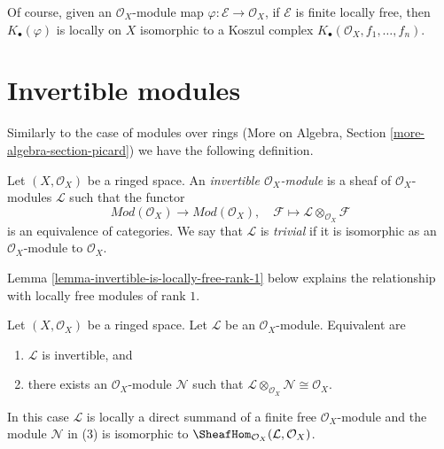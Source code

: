 \noindent
Of course, given an $\mathcal{O}_X$-module map
$\varphi : \mathcal{E} \to \mathcal{O}_X$,
if $\mathcal{E}$ is finite locally free, then
$K_\bullet(\varphi)$ is locally on $X$ isomorphic to a Koszul complex
$K_\bullet(\mathcal{O}_X, f_1, \ldots, f_n)$.



\section{Invertible modules}
\label{section-invertible}

\noindent
Similarly to the case of modules over rings
(More on Algebra, Section \ref{more-algebra-section-picard})
we have the following definition.

\begin{definition}
\label{definition-invertible}
Let $(X, \mathcal{O}_X)$ be a ringed space. An
{\it invertible $\mathcal{O}_X$-module} is a sheaf
of $\mathcal{O}_X$-modules $\mathcal{L}$ such that
the functor
$$
\textit{Mod}(\mathcal{O}_X) \longrightarrow \textit{Mod}(\mathcal{O}_X),\quad
\mathcal{F} \longmapsto \mathcal{L} \otimes_{\mathcal{O}_X} \mathcal{F}
$$
is an equivalence of categories. We say that $\mathcal{L}$ is
{\it trivial} if it is isomorphic as an $\mathcal{O}_X$-module
to $\mathcal{O}_X$.
\end{definition}

\noindent
Lemma \ref{lemma-invertible-is-locally-free-rank-1}
below explains the relationship with locally free modules
of rank $1$.

\begin{lemma}
\label{lemma-invertible}
Let $(X, \mathcal{O}_X)$ be a ringed space. Let $\mathcal{L}$
be an $\mathcal{O}_X$-module. Equivalent are
\begin{enumerate}
\item $\mathcal{L}$ is invertible, and
\item there exists an $\mathcal{O}_X$-module $\mathcal{N}$
such that
$\mathcal{L} \otimes_{\mathcal{O}_X} \mathcal{N} \cong \mathcal{O}_X$.
\end{enumerate}
In this case $\mathcal{L}$ is locally a direct summand of a finite free
$\mathcal{O}_X$-module and the module $\mathcal{N}$ in (3) is isomorphic to
$\SheafHom_{\mathcal{O}_X}(\mathcal{L}, \mathcal{O}_X)$.
\end{lemma}

